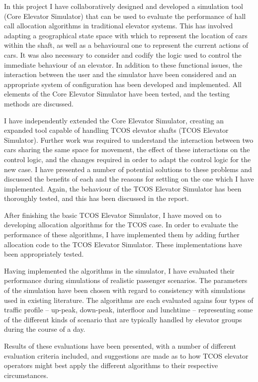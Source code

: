 \documentclass{UoYCSproject}
\begin{document}
In this project I have collaboratively designed and developed a simulation tool (Core Elevator Simulator) that can be used to evaluate the performance of hall call allocation algorithms in traditional elevator systems.  This has involved adapting a geographical state space with which to represent the location of cars within the shaft, as well as a behavioural one to represent the current actions of cars.  It was also necessary to consider and codify the logic used to control the immediate behaviour of an elevator.  In addition to these functional issues, the interaction between the user and the simulator have been considered and an appropriate system of configuration has been developed and implemented.  All elements of the Core Elevator Simulator have been tested, and the testing methods are discussed.

I have independently extended the Core Elevator Simulator, creating an expanded tool capable of handling TCOS elevator shafts (TCOS Elevator Simulator).  Further work was required to understand the interaction between two cars sharing the same space for movement, the effect of these interactions on the control logic, and the changes required in order to adapt the control logic for the new case.  I have presented a number of potential solutions to these problems and discussed the benefits of each and the reasons for settling on the one which I have implemented.  Again, the behaviour of the TCOS Elevator Simulator has been thoroughly tested, and this has been discussed in the report.

After finishing the basic TCOS Elevator Simulator, I have moved on to developing allocation algorithms for the TCOS case.  In order to evaluate the performance of these algorithms, I have implemented them by adding further allocation code to the TCOS Elevator Simulator.  These implementations have been appropriately tested.

Having implemented the algorithms in the simulator, I have evaluated their performance during simulations of realistic passenger scenarios.  The parameters of the simulation have been chosen with regard to consistency with simulations used in existing literature.  The algorithms are each evaluated agains four types of traffic profile -- up-peak, down-peak, interfloor and lunchtime -- representing some of the different kinds of scenario that are typically handled by elevator groups during the course of a day.

Results of these evaluations have been presented, with a number of different evaluation criteria included, and suggestions are made as to how TCOS elevator operators might best apply the different algorithms to their respective circumstances.
\end{document}
